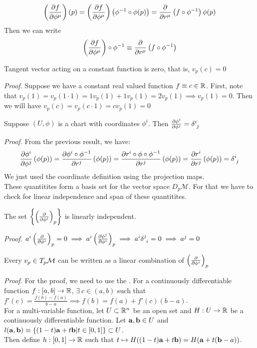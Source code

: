 $$\left( \pdv{f}{\phi^\mu} \right) \left( p \right) = \left( \pdv{f}{\phi^\mu} \right)\left( \phi^{-1}\circ \phi(p) \right) = \pdv{r^\mu}\left( f\circ \phi^{-1} \right){\phi(p)}$$
Then we can write 
$$\left( \pdv{f}{\phi^\mu} \right)\circ \phi^{-1} \equiv   \pdv{r^\mu}\left( f\circ \phi^{-1} \right)$$
\begin{ffact}
  Tangent vector acting on a constant function is zero, that is, $v_p(c) = 0$
\end{ffact}
\textit{Proof. } Suppose we have a constant real valued function $f\equiv c\in \mathbb{R}$. First, note that $v_p(1) = v_p(1\cdot 1) = 1v_p(1) + 1v_p(1) = 2v_p(1)\implies v_p(1)=0$. Then we will have $v_p(c) = v_p(c\cdot 1) = c v_p(1) = 0 $
\begin{proposition}
  Suppose $(U,\phi)$ is a chart with coordinates $\phi^i$. Then $\pdv{\phi^i}{\phi^j} = \tensor{\delta}{^i _j}$
\end{proposition}
\textit{Proof.} From the previous result, we have:
$$\pdv{\phi^i}{\phi^j}\brac{\phi(p)} = \pdv{\phi^i \circ \phi^{-1}}{r^j}\brac{\phi(p)} = \pdv{r^i\circ \phi \circ \phi^{-1}}{r^j}\brac{\phi(p)} =\pdv{r^i}{r^j}\brac{\phi(p)} = \tensor{\delta}{^i _j}$$
We just used the coordinate definition using the projection maps. \\[0.3cm]
These quantitites form a basis set for the vector space $D_p\mathcal{M}$. For that we have to check for linear independence and span of these quantitites. 
\begin{proposition}
 The set $\left\{\left( \pdv{\phi^i} \right)_p \right\}$ is linearly independent.
\end{proposition}
\textit{Proof.}  $a^i \brac{\pdv{\phi^i}}_p = 0\implies  a^i \brac{\pdv{\phi^j}{\phi^i}}_p \implies a^i\tensor{\delta}{^j _i} = 0 \implies a^j = 0$
\begin{proposition}
  Every $v_p\in T_p\mathcal M$ can be written as a linear combination of $\left( \pdv{\phi^i} \right)_p$
\end{proposition}
\textit{Proof.} For the proof, we need to use the . For a continuously differentiable function $f:[a,b]\rightarrow \mathbb{R}$, $\exists \ c\in(a,b)$ such that $f'(c) = \frac{f(b)-f(a)}{b-a}\implies f(b) = f(a)+ f'(c)(b-a)$.\\[0.2cm] For a multi-variable function, let $U\subset \mathbb{R}^n$ be an open set and $H:U\rightarrow \mathbb{R}$ be a continuously differentiable function. Let $\boldsymbol{\mathbf{a}},\boldsymbol{\mathbf{b}}\in U$ and $l(\boldsymbol{\mathbf{a}},\boldsymbol{\mathbf{b}})\equiv \{(1-t)\boldsymbol{\mathbf{a}}+t\boldsymbol{\mathbf{b}}|t\in [0,1]\}\subset U$.\\[0.2cm] Then define $h:[0,1]\rightarrow \mathbb{R}$ such that $t\mapsto H((1-t)\boldsymbol{\mathbf{a}}+t\boldsymbol{\mathbf{b}}) = H(\boldsymbol{\mathbf{a}}+t(\boldsymbol{\mathbf{b}}-a))$.\\[0.2cm]
